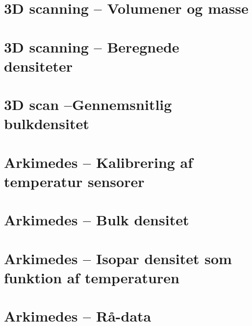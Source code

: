  \clearpage
 \FloatBlock
 \chapter{3D scanning -- Volumener og masse}


\clearpage
 \FloatBlock
 \chapter{3D scanning -- Beregnede densiteter}
 

\clearpage
 \FloatBlock
 \chapter{3D scan --Gennemsnitlig bulkdensitet}
 
 \clearpage
 \FloatBlock
 \chapter{Arkimedes -- Kalibrering af temperatur sensorer}
 

 \clearpage
 \FloatBlock
 \chapter{Arkimedes -- Bulk densitet}
 

 \FloatBlock
 \chapter{Arkimedes -- Isopar densitet som funktion af temperaturen}
 



 \clearpage
 \FloatBlock
 \chapter{Arkimedes -- Rå-data}
 

